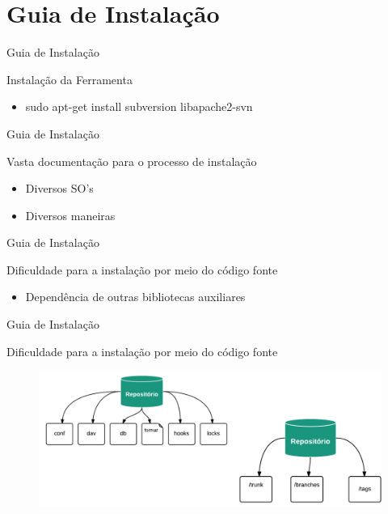 \section{Guia de Instalação}

\begin{frame}{Guia de Instalação}{}
\begin{block}{Instalação da Ferramenta}
  \begin{itemize}
    \item<1-> sudo apt-get install subversion libapache2-svn
  \end{itemize}
\end{block}
\end{frame}

\begin{frame}{Guia de Instalação}
\begin{block}{Vasta documentação para o processo de instalação}
  \begin{itemize}
    \item<1-> Diversos SO's
    \item<1-> Diversos maneiras
  \end{itemize}
\end{block}
\end{frame}

\begin{frame}{Guia de Instalação}
\begin{block}{Dificuldade para a instalação por meio do código fonte}
  \begin{itemize}
    \item<1-> Dependência de outras bibliotecas auxiliares
  \end{itemize}
\end{block}
\end{frame}

\begin{frame}{Guia de Instalação}
\begin{block}{Dificuldade para a instalação por meio do código fonte}
  \begin{figure}[h!]
    \centering
      \includegraphics[width=1\textwidth]{figuras/repo}
  \end{figure}
\end{block}
\end{frame}

